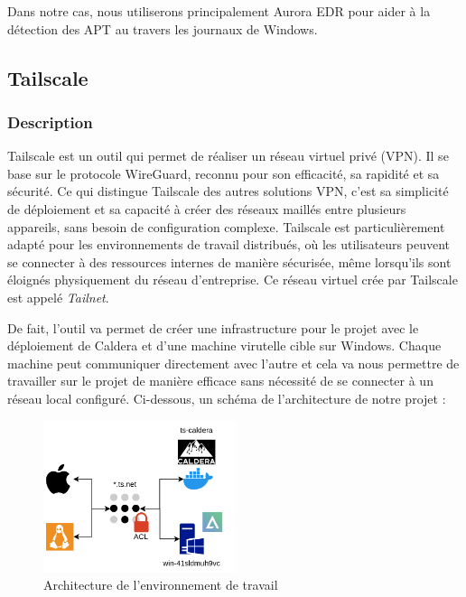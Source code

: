 \documentclass[12pt,letterpaper]{article}
\begin{document}
Dans notre cas, nous utiliserons principalement Aurora EDR pour aider à la détection des APT au travers les journaux de Windows.

\subsection{Tailscale}

\subsubsection{Description}

Tailscale est un outil qui permet de réaliser un réseau virtuel privé (VPN).
Il se base sur le protocole WireGuard, reconnu pour son efficacité, sa rapidité et sa sécurité.
Ce qui distingue Tailscale des autres solutions VPN, c'est sa simplicité de déploiement et sa capacité à créer des réseaux maillés entre plusieurs appareils, sans besoin de configuration complexe.
Tailscale est particulièrement adapté pour les environnements de travail distribués, où les utilisateurs peuvent se connecter à des ressources internes de manière sécurisée, même lorsqu'ils sont éloignés physiquement du réseau d'entreprise.
Ce réseau virtuel crée par Tailscale est appelé \textit{Tailnet}.

\bigskip

De fait, l'outil va permet de créer une infrastructure pour le projet avec le déploiement de Caldera et d'une machine virutelle cible sur Windows.
Chaque machine peut communiquer directement avec l'autre et cela va nous permettre de travailler sur le projet de manière efficace sans nécessité de se connecter à un réseau local configuré.
Ci-dessous, un schéma de l'architecture de notre projet :
\begin{figure}[!h]
    \centering
    \includegraphics[width=0.5\textwidth]{images/infra_scheme.png}
    \caption{Architecture de l'environnement de travail}
    \label{fig:architecture}
\end{figure}
\end{document}
